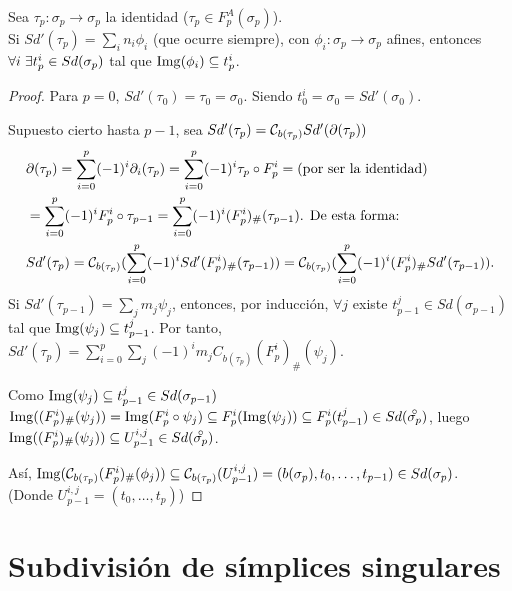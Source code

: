 Sea $\tau_p \colon \sigma_p \to \sigma_p$ la identidad ($\tau_p \in F_p^A(\sigma_p)$). \\
Si $Sd'(\tau_p) = \sum_i n_i \phi_i$ (que ocurre siempre), con $\phi_i \colon \sigma_p \to \sigma_p$ afines, entonces
$\forall i \hspace{0.3em} \exists t_p^i \in Sd(\sigma_p)$ tal que $\operatorname{Img}(\phi_i) \subseteq t_p^i$.

\begin{proof}
  Para $p = 0$, $Sd'(\tau_0) = \tau_0 = \sigma_0$. Siendo $t_0^i = \sigma_0 = Sd'(\sigma_0)$.

  Supuesto cierto hasta $p-1$, sea $Sd'(\tau_p) = {\mathcal C}_{b(\tau_p)} Sd'(\partial(\tau_p))$
  \begin{align*}
    &\partial(\tau_p) = \sum\limits_{i = 0}^p (-1)^i \partial_i(\tau_p) = \sum\limits_{i = 0}^p (-1)^i \tau_p \circ F_p^i = \text{(por ser la identidad)} \\
    &= \sum\limits_{i = 0}^p (-1)^i F_p^i \circ \tau_{p-1} = \sum\limits_{i = 0}^p (-1)^i(F_p^i)_\# (\tau_{p-1}) \text{. De esta forma:} \\
    &Sd'(\tau_p) = {\mathcal C}_{b(\tau_p)}(\sum\limits_{i = 0}^p (-1)^i Sd'(F_p^i)_\# (\tau_{p-1})) = {\mathcal C}_{b(\tau_p)}(\sum\limits_{i = 0}^p (-1)^i(F_p^i)_\# Sd'(\tau_{p-1})).
  \end{align*}
  Si $Sd'(\tau_{p-1}) = \sum\limits_j m_j \psi_j$, entonces, por inducción, $\forall j$ existe $t_{p-1}^j \in Sd(\sigma_{p-1})$ tal que
  $\operatorname{Img}(\psi_j) \subseteq t_{p-1}^j$. Por tanto, $Sd'(\tau_p) = \sum\limits_{i = 0}^p \sum\limits_j (-1)^i m_j C_{b(\tau_p)}(F_p^i)_\# (\psi_j)$.

  Como $\operatorname{Img}(\psi_j) \subseteq t_{p-1}^j \in Sd(\sigma_{p-1})$
  $\Img((F_p^i)_\# (\psi_j)) = \Img(F_p^i \circ \psi_j) \subseteq F_p^i(\Img(\psi_j)) \subseteq F_p^i(t_{p-1}^j) \in Sd(\interior{\sigma_p})$,
  luego $\Img((F_p^i)_\# (\psi_j)) \subseteq U_{p-1}^{i,j} \in Sd(\interior{\sigma_p})$.

  Así, $\operatorname{Img}({\mathcal C}_{b(\tau_p)}(F_p^i)_\# (\phi_j)) \subseteq {\mathcal C}_{b(\tau_p)}(U_{p-1}^{i, j}) = (b(\sigma_p), t_0, \dots, t_{p-1}) \in Sd(\sigma_p)$.\\
  (Donde $U_{p-1}^{i,j} = (t_0, \dots, t_p)$)
\end{proof}

\section{Subdivisión de símplices singulares}


